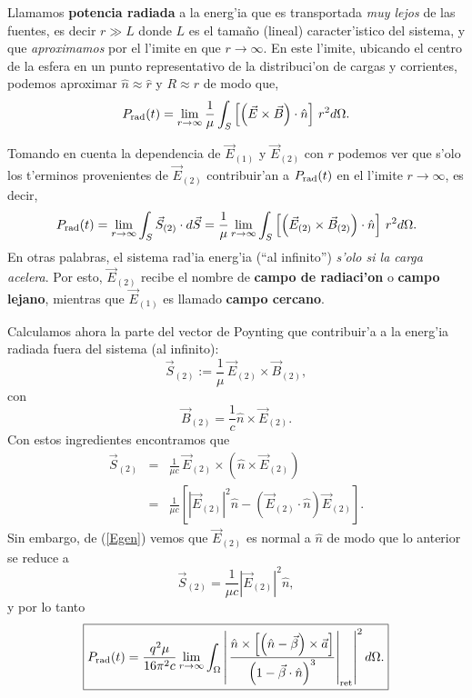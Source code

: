 Llamamos \textbf{potencia radiada} a la energ'ia que es transportada \textit{muy lejos} de las fuentes, es decir $r\gg L$ donde $L$ es el tama\~no (lineal) caracter'istico del sistema, y que \textit{aproximamos} por el l'imite en que $r\rightarrow\infty$. En este l'imite, ubicando el centro de la esfera en un punto representativo de la distribuci'on de cargas y corrientes, podemos aproximar $\hat{n}\approx\hat{r}$ y $R\approx r$ de modo que,
\begin{equation}
P_{\rm rad} (t)=\lim_{r\rightarrow\infty}\frac{1}{\mu}\int_S \left[ \left(
\vec{E}\times\vec{B}\right) \cdot \hat{n}\right] \,r^2 d\Omega.
\end{equation}

Tomando en cuenta la dependencia de $\vec{E}_{(1)}$ y $\vec{E}_{(2)}$ con $r$
podemos ver que s'olo los t'erminos provenientes de $\vec{E}_{(2)}$
contribuir'an a $P_{\rm rad}(t)$ en el l'imite $r\rightarrow\infty$, es decir,
\begin{equation}\label{Pinf1}
P_{\rm rad}(t)=\lim_{r\rightarrow\infty}\int_S \vec{S}_{(2)}\cdot
d\vec{S}=\frac{1}{\mu}\lim_{r\rightarrow\infty}\int_S \left[ \left(
\vec{E}_{(2)}\times\vec{B}_{(2)}\right) \cdot \hat{n}\right] \,r^2 d\Omega.
\end{equation}
En otras palabras, el sistema rad'ia energ'ia (``al infinito'') \textit{s'olo si la
carga acelera}. Por esto, $\vec{E}_{(2)}$ recibe el nombre de \textbf{campo de
radiaci'on} o \textbf{campo lejano}, mientras que $\vec{E}_{(1)}$ es llamado
\textbf{campo cercano}.

Calculamos ahora la parte del vector de Poynting que contribuir'a a la energ'ia
radiada fuera del sistema (al infinito):
\begin{equation}
 \vec{S}_{(2)}:=\frac{1}{\mu}\, \vec{E}_{(2)}\times\vec{B}_{(2)},
\end{equation}
con
\begin{equation}
\vec{B}_{(2)}= \frac{1}{c}\hat{n}\times\vec{E}_{(2)}.
\end{equation}
Con estos ingredientes encontramos que
\begin{eqnarray}
 \vec{S}_{(2)}&=&\frac{1}{\mu c}\, \vec{E}_{(2)}\times\left(
\hat{n}\times\vec{E}_{(2)}\right) \\
 &=& \frac{1}{\mu c}\left[ \left|\vec{E}_{(2)}\right|^2 \hat{n}-\left(
\vec{E}_{(2)}\cdot\hat{n}\right)  \vec{E}_{(2)}\right].
\end{eqnarray}
Sin embargo, de (\ref{Egen}) vemos que $\vec{E}_{(2)}$ es normal a $\hat{n}$ de
modo que lo anterior se reduce a
\begin{equation}\label{S2E}
 \boxed{\vec{S}_{(2)}= \frac{1}{\mu c} \left|\vec{E}_{(2)}\right|^2 \hat{n},}
\end{equation}
y por lo tanto
\begin{equation}
 \boxed{P_{\rm rad} (t)=\frac{q^2\mu}{16\pi^2c}\lim_{r\rightarrow\infty}\int_\Omega
\left|\left.\frac{\hat{n}\times\left[ \left( \hat{n}-\vec{\beta}\right)
\times{\vec{a}}\right] }{\left( 1-\vec{\beta}\cdot\hat{n}\right)
^3}\right|_{\rm ret}\right|^2 d\Omega.}
\end{equation}

